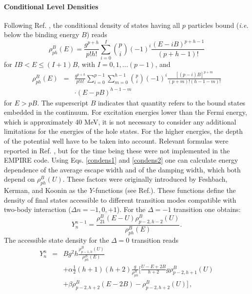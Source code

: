 \documentclass[twocolumn,amsmath,amssymb,10pt,groupedaddress,letter]{revtex4}
\begin{document}
\paragraph{Conditional Level Densities}
Following Ref. \cite{Stan}, the conditional density of states having
all $p$ particles bound ({\it i.e.} below the binding energy $B$) reads
\noindent \begin{equation}
\rho_{ph}^{B}(E)=\frac{g^{p+h}}{p!h!}\sum_{i=0}^{I}{{p \choose i}}(-1)^{i}\frac{(E-iB)^{p+h-1}}{(p+h-1)!}
\label{condens1}
\end{equation}
for $IB<E\leq(I+1)B$, with $I=0,1,...(p-1)$, and
\begin{eqnarray}
\rho_{ph}^{B}(E)&=&\frac{g^{p+h}}{p!h!}\sum_{i=0}^{p-1}\sum_{m=0}^{h-1}{{p \choose i}}(-1)^{i}\frac{[(p-i)B]^{p+m}}{(p+m)!(h-1-m)!}
\nonumber\\
&&\cdot(E-pB)^{h-1-m}
\label{condens2}
\end{eqnarray}
for $E>pB$. The superscript $B$ indicates that quantity refers to
the bound states embedded in the continuum. For excitation energies
lower than the Fermi energy, which is approximately 40 MeV, it is
not necessary to consider any additional limitations for the energies
of the hole states. For the higher energies, the depth of the potential
well have to be taken into account. Relevant formulas were reported
in Ref. \cite{Oblo}, but for the time being these were not implemented
in the EMPIRE code.
Using Eqs. \ref{condens1} and \ref{condens2} one can calculate energy
dependence of the average escape width and of the damping width, which
both depend on $\rho_{ph}^{B}(U)$. These factors were originally
introduced by Feshbach, Kerman, and Koonin as the $Y$-functions
(see Ref.\cite{FKK}).
These functions define the density of final
states accessible to different transition modes compatible with two-body
interaction ($\Delta n=-1,0,+1$). For the $\Delta=-1$ transition
one obtains:
\begin{equation}
Y_{n}^{n-1}=\frac{\rho_{21}^{B}(E-U)\rho_{p-2,h-2}^{B}(U)}{\rho_{ph}^{B}(E)}.
\label{Yminus}
\end{equation}
The accessible state density for the $\Delta=0$ transition reads
\begin{eqnarray}
Y_{n}^{n}  &= & Bg^{2}h\frac{\rho_{p-1,h}^{B}(U)}{\rho_{ph}^{B}(E)}\nonumber \\
 &  & +\alpha\frac{1}{2}(h+1)(h+2)\frac{g}{\rho_{ph}^{B}}\biggl[\frac{U-E+2B}{h+2}g\rho_{p-2,h+1}^{B}(U)\label{Yzero}\nonumber\\
 &  & +\beta\rho_{p-2,h+2}^{B}(E-2B)-\rho_{p-2,h+2}^{B}(U)\biggr]\,,
\end{eqnarray}
\end{document}
